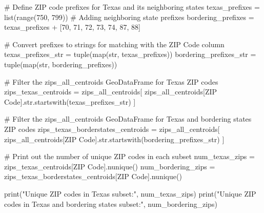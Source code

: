 \documentclass[
  letterpaper,
  DIV=11,
  numbers=noendperiod]{scrartcl}
\newenvironment{Shaded}{\begin{snugshade}}{\end{snugshade}}
\newcommand{\BuiltInTok}[1]{\textcolor[rgb]{0.00,0.23,0.31}{#1}}
\newcommand{\CommentTok}[1]{\textcolor[rgb]{0.37,0.37,0.37}{#1}}
\newcommand{\DecValTok}[1]{\textcolor[rgb]{0.68,0.00,0.00}{#1}}
\newcommand{\NormalTok}[1]{\textcolor[rgb]{0.00,0.23,0.31}{#1}}
\newcommand{\OperatorTok}[1]{\textcolor[rgb]{0.37,0.37,0.37}{#1}}
\newcommand{\StringTok}[1]{\textcolor[rgb]{0.13,0.47,0.30}{#1}}
\begin{document}
\begin{Shaded}
\begin{Highlighting}[]
\CommentTok{\# Define ZIP code prefixes for Texas and its neighboring states}
\NormalTok{texas\_prefixes }\OperatorTok{=} \BuiltInTok{list}\NormalTok{(}\BuiltInTok{range}\NormalTok{(}\DecValTok{750}\NormalTok{, }\DecValTok{799}\NormalTok{))}
\CommentTok{\# Adding neighboring state prefixes}
\NormalTok{bordering\_prefixes }\OperatorTok{=}\NormalTok{ texas\_prefixes }\OperatorTok{+}\NormalTok{ [}\DecValTok{70}\NormalTok{, }\DecValTok{71}\NormalTok{, }\DecValTok{72}\NormalTok{, }\DecValTok{73}\NormalTok{, }\DecValTok{74}\NormalTok{, }\DecValTok{87}\NormalTok{, }\DecValTok{88}\NormalTok{]}

\CommentTok{\# Convert prefixes to strings for matching with the \textquotesingle{}ZIP Code\textquotesingle{} column}
\NormalTok{texas\_prefixes\_str }\OperatorTok{=} \BuiltInTok{tuple}\NormalTok{(}\BuiltInTok{map}\NormalTok{(}\BuiltInTok{str}\NormalTok{, texas\_prefixes))}
\NormalTok{bordering\_prefixes\_str }\OperatorTok{=} \BuiltInTok{tuple}\NormalTok{(}\BuiltInTok{map}\NormalTok{(}\BuiltInTok{str}\NormalTok{, bordering\_prefixes))}

\CommentTok{\# Filter the zips\_all\_centroids GeoDataFrame for Texas ZIP codes}
\NormalTok{zips\_texas\_centroids }\OperatorTok{=}\NormalTok{ zips\_all\_centroids[}
\NormalTok{    zips\_all\_centroids[}\StringTok{\textquotesingle{}ZIP Code\textquotesingle{}}\NormalTok{].}\BuiltInTok{str}\NormalTok{.startswith(texas\_prefixes\_str)}
\NormalTok{]}

\CommentTok{\# Filter the zips\_all\_centroids GeoDataFrame for Texas and bordering states ZIP codes}
\NormalTok{zips\_texas\_borderstates\_centroids }\OperatorTok{=}\NormalTok{ zips\_all\_centroids[}
\NormalTok{    zips\_all\_centroids[}\StringTok{\textquotesingle{}ZIP Code\textquotesingle{}}\NormalTok{].}\BuiltInTok{str}\NormalTok{.startswith(bordering\_prefixes\_str)}
\NormalTok{]}

\CommentTok{\# Print out the number of unique ZIP codes in each subset}
\NormalTok{num\_texas\_zips }\OperatorTok{=}\NormalTok{ zips\_texas\_centroids[}\StringTok{\textquotesingle{}ZIP Code\textquotesingle{}}\NormalTok{].nunique()}
\NormalTok{num\_bordering\_zips }\OperatorTok{=}\NormalTok{ zips\_texas\_borderstates\_centroids[}\StringTok{\textquotesingle{}ZIP Code\textquotesingle{}}\NormalTok{].nunique()}

\BuiltInTok{print}\NormalTok{(}\StringTok{"Unique ZIP codes in Texas subset:"}\NormalTok{, num\_texas\_zips)}
\BuiltInTok{print}\NormalTok{(}\StringTok{"Unique ZIP codes in Texas and bordering states subset:"}\NormalTok{, num\_bordering\_zips)}
\end{Highlighting}
\end{Shaded}
\end{document}
